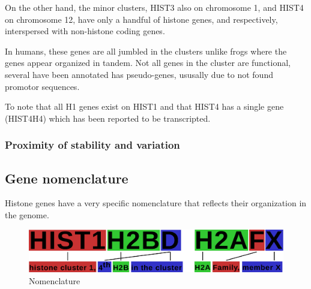 \documentclass[10pt,a4paper,draft,article]{memoir}
\begin{document}
        On the other hand, the minor clusters, HIST3 also on chromosome 1, and HIST4 on
        chromosome 12, have only a handful of histone genes, \CodingGenesInHistThree{} and
        \CodingGenesInHistFour{} respectively, interspersed with non-histone coding genes.


        In humans, these genes are all jumbled in the clusters unlike
        frogs where the genes appear organized in tandem. Not all genes in the cluster are functional, several have
        been annotated has pseudo-genes, ususally due to not found promotor sequences.

        To note that all H1 genes exist on HIST1 and that HIST4 has a single gene (HIST4H4) which has been reported to be transcripted.




        \subsubsection{Proximity of stability and variation}

    \subsection{Gene nomenclature}

      Histone genes have a very specific nomenclature that reflects their organization in the genome.

      \begin{figure}
        \centering
        \includegraphics[width=\textwidth]{nomenclature-schematic.pdf}
        \caption{Nomenclature}
        \label{fig:nomenclature}
      \end{figure}
\end{document}

